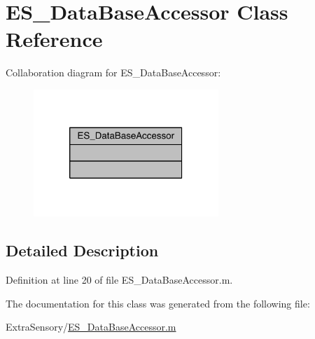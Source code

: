 \hypertarget{class_e_s___data_base_accessor}{\section{E\+S\+\_\+\+Data\+Base\+Accessor Class Reference}
\label{class_e_s___data_base_accessor}
}


Collaboration diagram for E\+S\+\_\+\+Data\+Base\+Accessor\+:\nopagebreak
\begin{figure}[H]
\begin{center}
\leavevmode
\includegraphics[width=198pt]{df/de7/class_e_s___data_base_accessor__coll__graph}
\end{center}
\end{figure}


\subsection{Detailed Description}


Definition at line 20 of file E\+S\+\_\+\+Data\+Base\+Accessor.\+m.



The documentation for this class was generated from the following file\+:\begin{DoxyCompactItemize}
\item 
Extra\+Sensory/\hyperlink{_e_s___data_base_accessor_8m}{E\+S\+\_\+\+Data\+Base\+Accessor.\+m}\end{DoxyCompactItemize}
